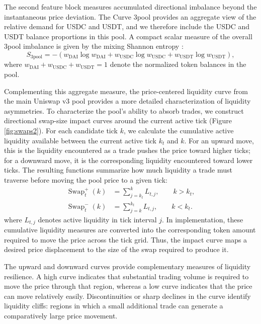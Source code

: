 \documentclass[a4paper,fleqn]{cas-sc}
\begin{document}
The second feature block measures accumulated directional imbalance beyond the instantaneous price deviation. The Curve 3pool provides an aggregate view of the relative demand for USDC and USDT, and we therefore include the USDC and USDT balance proportions in this pool. A compact scalar measure of the overall 3pool imbalance is given by the mixing Shannon entropy \citep{cintra2023}:
\begin{equation}
S_{\mathrm{3pool}} = -\left(w_{\mathrm{DAI}}\log w_{\mathrm{DAI}} + w_{\mathrm{USDC}}\log w_{\mathrm{USDC}} + w_{\mathrm{USDT}}\log w_{\mathrm{USDT}}\right),
\end{equation}
where $w_{\mathrm{DAI}} + w_{\mathrm{USDC}} + w_{\mathrm{USDT}} = 1$ denote the normalized token balances in the pool.

Complementing this aggregate measure, the price-centered liquidity curve from the main Uniswap v3 pool provides a more detailed characterization of liquidity asymmetries. To characterize the pool’s ability to absorb trades, we construct directional swap-size impact curves around the current active tick (Figure \ref{fig:swaps2}). For each candidate tick \(k\), we calculate the cumulative active liquidity available between the current active tick \(k_t\) and \(k\). For an upward move, this is the liquidity encountered as a trade pushes the price toward higher ticks; for a downward move, it is the corresponding liquidity encountered toward lower ticks. The resulting functions summarize how much liquidity a trade must traverse before moving the pool price to a given tick:
\begin{equation}
\begin{split}
\operatorname{Swap}_t^{+}(k) &= \sum_{j=k_t}^{k} L_{t,j}, \qquad k>k_t,\\
\operatorname{Swap}_t^{-}(k) &= \sum_{j=k}^{k_t} L_{t,j}, \qquad k<k_t.
\end{split}
\end{equation}
where \(L_{t,j}\) denotes active liquidity in tick interval \(j\). In implementation, these cumulative liquidity measures are converted into the corresponding token amount required to move the price across the tick grid. Thus, the impact curve maps a desired price displacement to the size of the swap required to produce it.

The upward and downward curves provide complementary measures of liquidity resilience. A high curve indicates that substantial trading volume is required to move the price through that region, whereas a low curve indicates that the price can move relatively easily. Discontinuities or sharp declines in the curve identify liquidity cliffs: regions in which a small additional trade can generate a comparatively large price movement.
\end{document}
